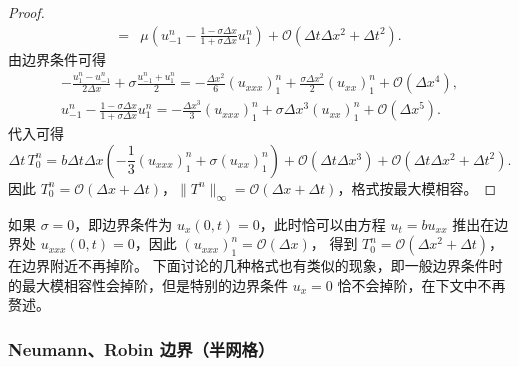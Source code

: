 \begin{proof}
\begin{align*}
        ={}                    & \mu\left(u_{-1}^n - \frac{1-\sigma \Delta x}{1+\sigma \Delta x} u_1^n\right)
        + \mathcal{O}(\Delta t \Delta x^2 + \Delta t^2).
    \end{align*}
    由边界条件可得
    \begin{gather*}
        - \frac{u_{1}^{n}-u_{-1}^{n}}{2\Delta x} + \sigma \frac{u_{-1}^n + u_1^n}2 =
        -\frac{\Delta x^2}6 (u_{xxx})_1^n
        + \frac{\sigma \Delta x^2}2 (u_{xx})_1^n
        + \mathcal{O}(\Delta x^4),\\
        u_{-1}^n - \frac{1-\sigma \Delta x}{1+\sigma \Delta x} u_1^n =
        -\frac{\Delta x^3}3 (u_{xxx})_1^n
        +  \sigma \Delta x^3  (u_{xx})_1^n
        + \mathcal{O}(\Delta x^5).
    \end{gather*}
    代入可得
    \[
        \Delta t\, T_0^{n} ={}  b \Delta t \Delta x \left( -\frac13 (u_{xxx})_1^n +\sigma (u_{xx})_1^n \right)
        + \mathcal{O}(\Delta t\Delta x^3) + \mathcal{O}(\Delta t \Delta x^2 + \Delta t^2).
    \]
    因此 $T_0^n = \mathcal{O}(\Delta x + \Delta t)$，$\|T^n\|_{\infty} = \mathcal{O}(\Delta x + \Delta t)$，格式按最大模相容。
\end{proof}

\begin{remark}
    如果 $\sigma = 0$，即边界条件为 $u_x(0,t) = 0$，此时恰可以由方程 $u_t = b u_{xx}$ 推出在边界处 $u_{xxx}(0,t) = 0$，因此 $(u_{xxx})_1^n = \mathcal{O}(\Delta x)$，
    得到 $T_0^n = \mathcal{O}(\Delta x^2 + \Delta t)$，在边界附近不再掉阶。
    下面讨论的几种格式也有类似的现象，即一般边界条件时的最大模相容性会掉阶，但是特别的边界条件 $u_x = 0$ 恰不会掉阶，在下文中不再赘述。
\end{remark}


\subsubsection{Neumann、Robin 边界（半网格）}

